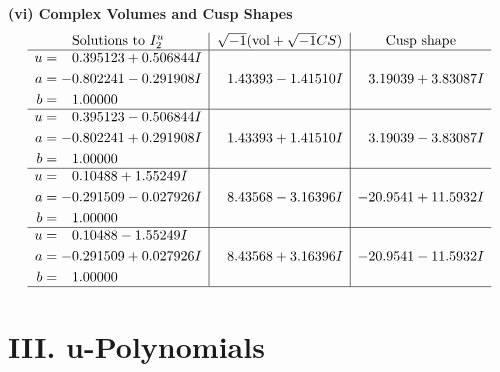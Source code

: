 \documentclass[1p]{elsarticle_modified}
\theoremstyle{definition}
\newcommand{\I}{\sqrt{-1}}
\begin{document}
\newpage\flushleft \textbf{(vi) Complex Volumes and Cusp Shapes}
$$\begin{array}{c|c|c}  
\text{Solutions to }I^u_{2}& \I (\text{vol} + \sqrt{-1}CS) & \text{Cusp shape}\\
 \hline 
\begin{aligned}
u &= \phantom{-}0.395123 + 0.506844 I \\
a &= -0.802241 - 0.291908 I \\
b &= \phantom{-}1.00000\phantom{ +0.000000I}\end{aligned}
 & \phantom{-}1.43393 - 1.41510 I & \phantom{-}3.19039 + 3.83087 I \\ \hline\begin{aligned}
u &= \phantom{-}0.395123 - 0.506844 I \\
a &= -0.802241 + 0.291908 I \\
b &= \phantom{-}1.00000\phantom{ +0.000000I}\end{aligned}
 & \phantom{-}1.43393 + 1.41510 I & \phantom{-}3.19039 - 3.83087 I \\ \hline\begin{aligned}
u &= \phantom{-}0.10488 + 1.55249 I \\
a &= -0.291509 - 0.027926 I \\
b &= \phantom{-}1.00000\phantom{ +0.000000I}\end{aligned}
 & \phantom{-}8.43568 - 3.16396 I & -20.9541 + 11.5932 I \\ \hline\begin{aligned}
u &= \phantom{-}0.10488 - 1.55249 I \\
a &= -0.291509 + 0.027926 I \\
b &= \phantom{-}1.00000\phantom{ +0.000000I}\end{aligned}
 & \phantom{-}8.43568 + 3.16396 I & -20.9541 - 11.5932 I\\
 \hline 
 \end{array}$$\newpage
\newpage\renewcommand{\arraystretch}{1}
\centering \section*{ III. u-Polynomials}
\end{document}
